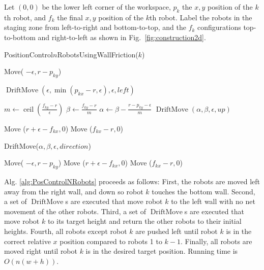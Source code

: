 Let $(0,0)$ be the lower left corner of the workspace, $p_k$ the $x,y$ position of the $k$th robot, and $f_k$ the final $x,y$ position of the $k$th robot. Label the robots in the staging zone from left-to-right and bottom-to-top, and the $f_k$ configurations top-to-bottom and right-to-left as shown in Fig.~\ref{fig:construction2d}.

\begin{algorithm}
\caption{PositionControl$n$RobotsUsingWallFriction($k$)}\label{alg:PosControlNRobots}
\begin{algorithmic}[1]
\State Move( $-\epsilon, r-p_{ky}$) %


\State $\operatorname{DriftMove}(\epsilon, \min(p_{kx} - r,\epsilon), \epsilon,left)$    %
\EndWhile

\State $m \gets \operatorname{ceil}(\frac{f_{ky}-r}{\epsilon})$
\State $\beta \gets \frac{f_{ky}-r}{m}$
\State $\alpha \gets \beta - \frac{r - p_{ky}-\epsilon}{m}$
\State $\operatorname{DriftMove}(\alpha, \beta, \epsilon,up)$    %
\EndFor

\State Move ($r+\epsilon-f_{kx}, 0$)  %
\State Move ($f_{kx}-r, 0$)  

\end{algorithmic}
\end{algorithm}


\begin{algorithm}
\caption{ {\sc DriftMove}($\alpha,\beta,\epsilon,direction$)}\label{alg:DriftMove}
\begin{algorithmic}[1]
\State Move( $-\epsilon, r-p_{ky}$) %
\State Move ($r+\epsilon-f_{kx}, 0$)  %
\State Move ($f_{kx}-r, 0$)  

\end{algorithmic}
\end{algorithm}


Alg. \ref{alg:PosControlNRobots} proceeds as follows:  
First, the robots are moved left away from the right wall, and down so robot $k$ touches the bottom wall.
Second, a set of $\operatorname{DriftMove}$s are executed that move robot $k$ to the left wall with no net movement of the other robots.
Third, a set of $\operatorname{DriftMove}$s are executed that  move robot $k$ to its target height and return the other robots to their initial heights. 
Fourth, all robots except robot $k$ are pushed left until robot $k$ is in the correct relative $x$ position compared to robots 1 to $k-1$.
Finally, all robots are moved right until robot $k$ is in the desired target position. Running time is $O(n(w+h))$.



